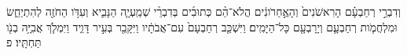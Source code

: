 \documentclass{openreader}
\begin{document}
וְדִבְרֵ֣י רְחַבְעָ֗ם הָרִאשֹׁנִים֙ וְהָאֲ֣חַרֹונִ֔ים הֲלֹא־הֵ֨ם כְּתוּבִ֜ים בְּדִבְרֵ֨י שְׁמַֽעְיָ֧ה הַנָּבִ֛יא וְעִדֹּ֥ו הַחֹזֶ֖ה לְהִתְיַחֵ֑שׂ וּמִלְחֲמֹ֧ות רְחַבְעָ֛ם וְיָרָבְעָ֖ם כָּל־הַיָּמִֽים׃ 
וַיִּשְׁכַּ֤ב רְחַבְעָם֙ עִם־אֲבֹתָ֔יו וַיִּקָּבֵ֖ר בְּעִ֣יר דָּוִ֑יד וַיִּמְלֹ֛ךְ אֲבִיָּ֥ה בְנֹ֖ו תַּחְתָּֽיו׃ פ 
\end{document}
